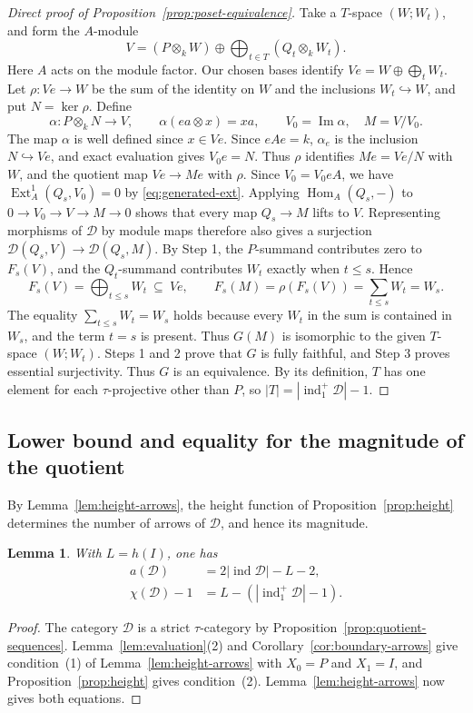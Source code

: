 \documentclass[a4paper,reqno,10pt]{amsart}
\newtheorem{lemma}[theorem]{Lemma}
\theoremstyle{definition}
\numberwithin{equation}{section}
\DeclareMathOperator{\ind}{ind}
\DeclareMathOperator{\Hom}{Hom}
\DeclareMathOperator{\Ext}{Ext}
\newcommand{\cD}{\mathcal D}
\begin{document}
\begin{proof}[Direct proof of Proposition~\ref{prop:poset-equivalence}]
Take a \(T\)-space \((W;W_t)\), and form the \(A\)-module
\[
 V=(P\otimes_k W)\oplus\bigoplus_{t\in T}(Q_t\otimes_k W_t).
\]
Here \(A\) acts on the module factor. Our chosen bases identify
\(Ve=W\oplus\bigoplus_tW_t\). Let \(\rho:Ve\to W\) be the sum of
the identity on \(W\) and the inclusions \(W_t\hookrightarrow W\),
and put \(N=\ker\rho\). Define
\[
 \alpha:P\otimes_k N\longrightarrow V,\qquad
 \alpha(ea\otimes x)=xa,
 \qquad V_0=\operatorname{Im}\alpha,\quad M=V/V_0.
\]
The map \(\alpha\) is well defined since \(x\in Ve\). Since \(eAe=k\),
\(\alpha_e\) is the inclusion \(N\hookrightarrow Ve\), and exact
evaluation gives \(V_0e=N\). Thus \(\rho\) identifies \(Me=Ve/N\) with
\(W\), and the quotient map \(Ve\to Me\) with \(\rho\).
Since \(V_0=V_0eA\), we have \(\Ext_A^1(Q_s,V_0)=0\)
by \eqref{eq:generated-ext}. Applying \(\Hom_A(Q_s,-)\) to
\(0\to V_0\to V\to M\to0\) shows that every map \(Q_s\to M\)
lifts to \(V\). Representing morphisms of \(\cD\) by module maps
therefore also gives a surjection \(\cD(Q_s,V)\to\cD(Q_s,M)\).
By Step 1, the \(P\)-summand contributes zero to \(F_s(V)\), and the
\(Q_t\)-summand contributes \(W_t\) exactly when \(t\leq s\). Hence
\[
 F_s(V)=\bigoplus_{t\leq s}W_t\ \subseteq\ Ve,
 \qquad F_s(M)=\rho(F_s(V))=\sum_{t\leq s}W_t=W_s.
\]
The equality \(\sum_{t\leq s}W_t=W_s\) holds because every \(W_t\) in the sum is contained in
\(W_s\), and the term \(t=s\) is present. Thus \(G(M)\) is isomorphic to the given
\(T\)-space \((W;W_t)\).
Steps 1 and 2 prove that \(G\) is fully faithful, and Step 3 proves
essential surjectivity. Thus \(G\) is an equivalence. By its definition,
\(T\) has one element for each \(\tau\)-projective other than \(P\),
so \(|T|=|\ind_1^+\cD|-1\).
\end{proof}

\subsection{Lower bound and equality for the magnitude of the quotient}\label{app:inequality}
By Lemma~\ref{lem:height-arrows}, the height function of
Proposition~\ref{prop:height} determines the number of arrows of \(\cD\),
and hence its magnitude.
\begin{lemma}\label{lem:height-count}
With \(L=h(I)\), one has
\begin{align}
 a(\cD)&=2|\ind\cD|-L-2,\label{eq:height-count}\\
 \chi(\cD)-1&=L-(|\ind_1^+\cD|-1).\label{eq:height-chi}
\end{align}
\end{lemma}
\begin{proof}
The category \(\cD\) is a strict \(\tau\)-category by
Proposition~\ref{prop:quotient-sequences}.
Lemma~\ref{lem:evaluation}(2) and Corollary~\ref{cor:boundary-arrows} give
condition~(1) of Lemma~\ref{lem:height-arrows} with \(X_0=P\) and
\(X_1=I\), and Proposition~\ref{prop:height} gives condition~(2).
Lemma~\ref{lem:height-arrows} now gives both equations.
\end{proof}
\end{document}
